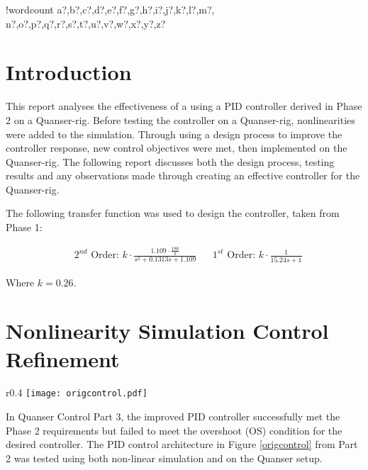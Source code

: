 \documentclass[11pt]{article}
\newcounter{words}
\newenvironment{counted}{%
  \setcounter{words}{0}
  \SearchList!{wordcount}{\stepcounter{words}}
    {a?,b?,c?,d?,e?,f?,g?,h?,i?,j?,k?,l?,m?,
    n?,o?,p?,q?,r?,s?,t?,u?,v?,w?,x?,y?,z?}
  \UndoBoundary{'}
  \SearchOrder{p;}}{%
  \StopSearching}
\begin{document}
\clearpage
{}
\begin{counted} %
\section{Introduction}\label{introduction}

This report analyses the effectiveness of a using a PID controller
derived in Phase 2 on a Quanser-rig. Before testing the controller on a
Quanser-rig, nonlinearities were added to the simulation. Through using
a design process to improve the controller response, new control
objectives were met, then implemented on the Quanser-rig. The following
report discusses both the design process, testing results and any
observations made through creating an effective controller for the
Quanser-rig.

The following transfer function was used to design the controller, taken
from Phase 1:

\begin{align*}
&\text{$2^{nd}$ Order: }k \cdot \frac { 1.109\cdot \frac{180} {\pi} }{ s^2 + 0.1313s +1.109 }
&&\text{$1^{st}$ Order: }k \cdot \frac { 1 }{ 15.24s +1 }
\end{align*}

Where \(k = 0.26\).

\section{Nonlinearity Simulation Control
Refinement}\label{nonlinearity-simulation-control-refinement}

\begin{wrapfigure}{r}{0.4\textwidth}
 \vspace{-25pt}
 \centering
  \texttt{[image: origcontrol.pdf]}
\vspace{-10pt}
  \caption{Showing original Controller Architecture}
  \vspace{-25pt}
  \label{origcontrol}
 \end{wrapfigure}

In Quanser Control Part 3, the improved PID controller successfully met
the Phase 2 requirements but failed to meet the overshoot (OS) condition
for the desired controller. The PID control architecture in Figure
\ref{origcontrol} from Part 2 was tested using both non-linear
simulation and on the Quanser setup.


\end{counted}
\end{document}
